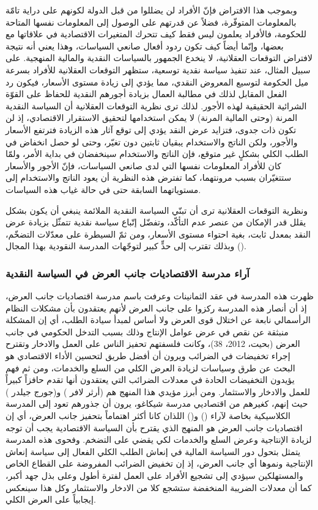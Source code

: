 \documentclass[10pt,a4paper]{report}
\begin{document}
\begin{doublespacing}
وبموجب هذا الافتراض فإنّ الأفراد لن يضللوا من قبل الدولة لكونهم على دراية تامّة بالمعلومات المتوفّرة، فضلاً عن قدرتهم على الوصول إلى المعلومات نفسها المتاحة للحكومة، فالأفراد يعلمون ليس فقط كيف تتحرك المتغيرات الاقتصادية في علاقاتها مع بعضها، وإنّما أيضاً كيف تكون ردود أفعال صانعي السياسات، وهذا يعني أنه نتيجة لافتراض التوقعات العقلانية، لا ينخدع الجمهور بالسياسات النقدية والمالية المنهجية. على سبيل المثال، عند تنفيذ سياسة نقدية توسعية، ستظهر التوقعات العقلانية للأفراد بسرعة ميل الحكومة لتوسيع المعروض النقدي، مما يؤدي إلى زيادة مستوى الأسعار، فيكون رد الفعل المقابل لذلك في مطالبة العمال بزيادة أجورهم النقدية للحفاظ على القوّة الشرائية الحقيقية لهذه الأجور. لذلك ترى نظرية التوقعات العقلانية أن السياسة النقدية المرنة (وحتى المالية المرنة) لا يمكن استخدامها لتحقيق الاستقرار الاقتصادي، إذ لن تكون ذات جدوى، فتزايد عرض النقد يؤدي إلى توقع آثار هذه الزيادة فترتفع الأسعار والأجور، ولكن الناتج والاستخدام يبقيان ثابتين دون تغيّر، وحتى لو حصل انخفاض في الطلب الكلي بشكلٍ غير متوقع، فإن الناتج والاستخدام سينخفضان في بداية الأمر، ولمّا كان للأفراد المعلومات نفسها التي لدى صانعي السياسات، فإنّ الأجور والأسعار ستتغيّران بسبب مرونتهما، كما تفترض هذه النظرية أن يعود الناتج والاستخدام إلى مستوياتهما السابقة حتى في حالة غياب هذه السياسات.

ونظرية التوقعات العقلانية ترى أن تبنّي السياسة النقدية الملائمة ينبغي أن يكون بشكل يقلل قدر الإمكان من عنصر عدم التأكّد، وتفضّل إتّباع سياسة نقدية تتمثّل بزيادة عرض النقد بمعدل ثابت، بغية احتواء مستوى الأسعار، ومن ثمّ السيطرة على معدّلات التضخّم، وبذلك تقترب إلى حدٍّ كبير لتوجّهات المدرسة النقودية بهذا المجال ().
\subsubsection{آراء مدرسة الاقتصاديات جانب العرض في السياسة النقدية}
ظهرت هذه المدرسة في عقد الثمانينات وعرفت باسم مدرسة اقتصاديات جانب العرض، إذ أن أنصار هذه المدرسة ركزوا على جانب العرض لأنهم يعتقدون بأن مشكلات النظام الرأسمالي نابعة عن اختلال قوى العرض ولا أساس لمبدأ سيادة الطلب، أي إن المشكلة منبثقة عن نقص في عرض عوامل الإنتاج وذلك بسبب التدخل الحكومي في جانب العرض ({بحيت، 2012، 38})، وكانت فلسفتهم تحفيز الناس على العمل والادخار وتقترح إجراء تخفيضات في الضرائب ويرون أن أفضل طريق لتحسين الأداء الاقتصادي هو البحث عن طرق وسياسات لزيادة العرض الكلي من السلع والخدمات، ومن ثم فهم يؤيدون التخفيضات الحادة في معدلات الضرائب التي يعتقدون أنها تقدم حافزاً كبيراً للعمل والادخار والاستثمار. ومن أبرز مؤيدي هذا المنهج هم ({أرثر لافر }) و({جورج جيلدر }) حيث إنهم، كغيرهم من اقتصاديي مدرسة شيكاغو، يرون أن جذورهم تعود إلى المدرسة الكلاسيكية بخاصة لآراء () و() اللذان كانا أكثر اهتماماً بتحفيز جانب العرض، أي إن اقتصاديات جانب العرض هو المنهج الذي يقترح بأن السياسة الاقتصادية يجب أن توجه لزيادة الإنتاجية وعرض السلع والخدمات لكي يقضي على التضخم. وفحوى هذه المدرسة يتمثل بتحول دور السياسة المالية في إنعاش الطلب الكلي الفعال إلى سياسة إنعاش الإنتاجية ونموها أي جانب العرض، إذ إن تخفيض الضرائب المفروضة على القطاع الخاص والمستهلكين سيؤدي إلى تشجيع الأفراد على العمل لفترة أطول وعلى بذل جهد أكبر، كما أن معدلات الضريبة المنخفضة ستشجع كلا من الادخار والاستثمار وكل هذا سينعكس إيجابياً على العرض الكلي. 


\end{doublespacing}
\end{document}
